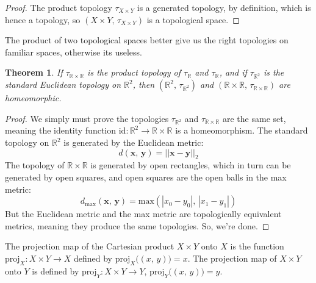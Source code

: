 \documentclass{article}
\theoremstyle{plain}
\newtheorem{theorem}{Theorem}[section]
\theoremstyle{normal}
\newenvironment{definition}{%
    \pushQED{\qed}\renewcommand{\qedsymbol}{$\blacksquare$}\definitionx%
}{%
    \popQED\enddefinitionx%
}
\begin{document}
        \begin{proof}
            The product topology $\tau_{X\times{Y}}$ is a generated topology,
            by definition, which is hence a topology, so
            $(X\times{Y},\,\tau_{X\times{Y}})$ is a topological space.
        \end{proof}
        The product of two topological spaces better give us the right
        topologies on familiar spaces, otherwise its useless.
        \begin{theorem}
            If $\tau_{\mathbb{R}\times\mathbb{R}}$ is the product topology of
            $\tau_{\mathbb{R}}$ and $\tau_{\mathbb{R}}$, and if
            $\tau_{\mathbb{R}^{2}}$ is the standard Euclidean topology on
            $\mathbb{R}^{2}$, then
            $(\mathbb{R}^{2},\,\tau_{\mathbb{R}^{2}})$ and
            $(\mathbb{R}\times\mathbb{R},\,\tau_{\mathbb{R}\times\mathbb{R}})$
            are homeomorphic.
        \end{theorem}
        \begin{proof}
            We simply must prove the topologies $\tau_{\mathbb{R}^{2}}$ and
            $\tau_{\mathbb{R}\times\mathbb{R}}$ are the same set, meaning the
            identity function
            $\textrm{id}:\mathbb{R}^{2}\rightarrow\mathbb{R}\times\mathbb{R}$
            is a homeomorphism. The standard topology on $\mathbb{R}^{2}$
            is generated by the Euclidean metric:
            \begin{equation}
                d(\mathbf{x},\,\mathbf{y})=||\mathbf{x}-\mathbf{y}||_{2}
            \end{equation}
            The topology of $\mathbb{R}\times\mathbb{R}$ is generated by open
            rectangles, which in turn can be generated by open squares, and
            open squares are the open balls in the max metric:
            \begin{equation}
                d_{\textrm{max}}(\mathbf{x},\,\mathbf{y})
                =\textrm{max}(|x_{0}-y_{0}|,\,|x_{1}-y_{1}|)
            \end{equation}
            But the Euclidean metric and the max metric are topologically
            equivalent metrics, meaning they produce the same topologies.
            So, we're done.
        \end{proof}
        \begin{definition}[\textbf{Projection Maps}]
            The projection map of the Cartesian product $X\times{Y}$ onto
            $X$ is the function $\textrm{proj}_{X}:X\times{Y}\rightarrow{X}$
            defined by $\textrm{proj}_{X}\big((x,\,y)\big)=x$. The projection
            map of $X\times{Y}$ onto $Y$ is defined by
            $\textrm{proj}_{Y}:X\times{Y}\rightarrow{Y}$,
            $\textrm{proj}_{Y}\big((x,\,y)\big)=y$.
        \end{definition}
\end{document}
